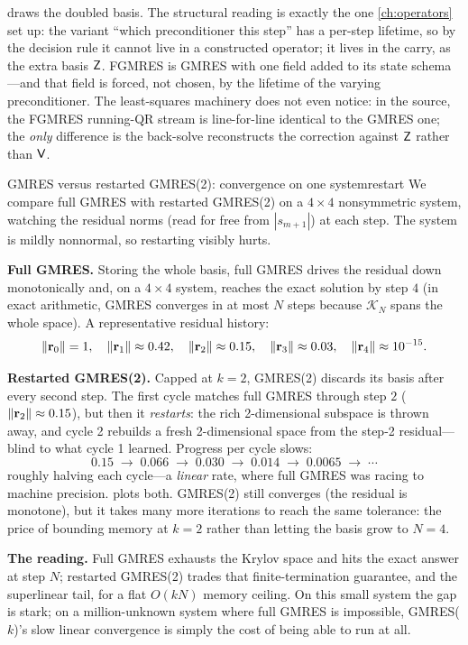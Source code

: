  draws the doubled basis. The structural reading is exactly the one
\cref{ch:operators} set up: the variant ``which preconditioner this step'' has a
per-step lifetime, so by the decision rule it cannot live in a constructed operator;
it lives in the carry, as the extra basis $\mathsf{Z}$. FGMRES is GMRES with one field
added to its state schema---and that field is forced, not chosen, by the lifetime of
the varying preconditioner. The least-squares machinery does not even notice: in the
source, the FGMRES running-QR stream is line-for-line identical to the GMRES one; the
\emph{only} difference is the back-solve reconstructs the correction against $\mathsf{Z}$
rather than $\mathsf{V}$.

\begin{workedexample}{GMRES versus restarted GMRES(2): convergence on one system}{restart}
We compare full GMRES with restarted GMRES(2) on a $4\times4$ nonsymmetric system,
watching the residual norms (read for free from $|s_{m+1}|$) at each step. The system
is mildly nonnormal, so restarting visibly hurts.

\textbf{Full GMRES.} Storing the whole basis, full GMRES drives the residual down
monotonically and, on a $4\times4$ system, reaches the exact solution by step $4$ (in
exact arithmetic, GMRES converges in at most $N$ steps because $\mathcal{K}_N$ spans
the whole space). A representative residual history:
\[
  \lVert\mathbf{r}_0\rVert=1,\quad \lVert\mathbf{r}_1\rVert\approx0.42,\quad \lVert\mathbf{r}_2\rVert\approx0.15,\quad
  \lVert\mathbf{r}_3\rVert\approx0.03,\quad \lVert\mathbf{r}_4\rVert\approx10^{-15}.
\]

\textbf{Restarted GMRES(2).} Capped at $k=2$, GMRES(2) discards its basis after every
second step. The first cycle matches full GMRES through step $2$
($\lVert\mathbf{r}_2\rVert\approx0.15$), but then it \emph{restarts}: the rich 2-dimensional
subspace is thrown away, and cycle 2 rebuilds a fresh 2-dimensional space from the
step-2 residual---blind to what cycle 1 learned. Progress per cycle slows:
\[
  0.15 \;\to\; 0.066 \;\to\; 0.030 \;\to\; 0.014 \;\to\; 0.0065 \;\to\;\cdots
\]
roughly halving each cycle---a \emph{linear} rate, where full GMRES was racing to
machine precision.  plots both. GMRES(2) still converges (the
residual is monotone), but it takes many more iterations to reach the same tolerance:
the price of bounding memory at $k=2$ rather than letting the basis grow to $N=4$.

\textbf{The reading.} Full GMRES exhausts the Krylov space and hits the exact answer
at step $N$; restarted GMRES(2) trades that finite-termination guarantee, and the
superlinear tail, for a flat $O(kN)$ memory ceiling. On this small system the gap is
stark; on a million-unknown system where full GMRES is impossible, GMRES($k$)'s slow
linear convergence is simply the cost of being able to run at all.
\end{workedexample}

